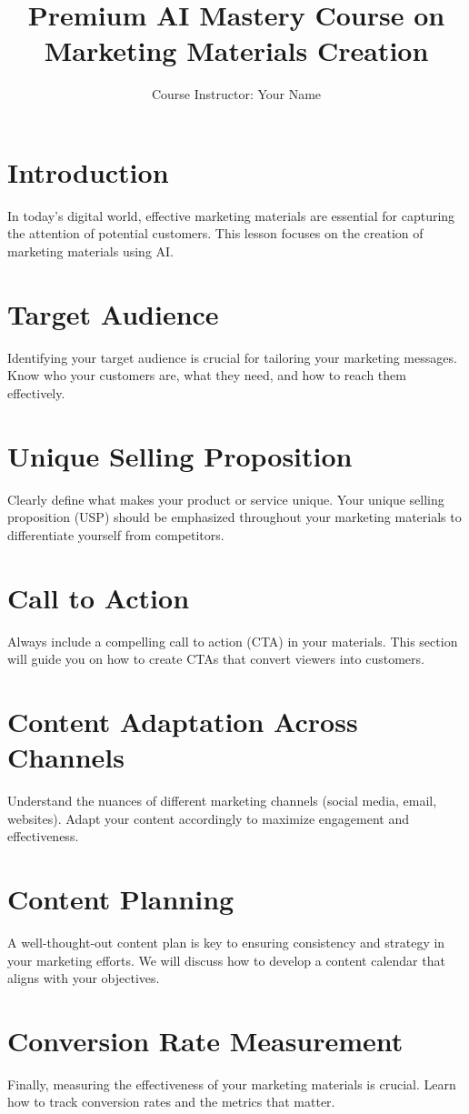 \documentclass{article}
\title{Premium AI Mastery Course on Marketing Materials Creation}
\author{Course Instructor: Your Name}
\begin{document}
\maketitle

\section{Introduction}
In today’s digital world, effective marketing materials are essential for capturing the attention of potential customers. This lesson focuses on the creation of marketing materials using AI.

\section{Target Audience}
Identifying your target audience is crucial for tailoring your marketing messages. Know who your customers are, what they need, and how to reach them effectively.

\section{Unique Selling Proposition}
Clearly define what makes your product or service unique. Your unique selling proposition (USP) should be emphasized throughout your marketing materials to differentiate yourself from competitors.

\section{Call to Action}
Always include a compelling call to action (CTA) in your materials. This section will guide you on how to create CTAs that convert viewers into customers.

\section{Content Adaptation Across Channels}
Understand the nuances of different marketing channels (social media, email, websites). Adapt your content accordingly to maximize engagement and effectiveness.

\section{Content Planning}
A well-thought-out content plan is key to ensuring consistency and strategy in your marketing efforts. We will discuss how to develop a content calendar that aligns with your objectives.

\section{Conversion Rate Measurement}
Finally, measuring the effectiveness of your marketing materials is crucial. Learn how to track conversion rates and the metrics that matter.
\end{document}
